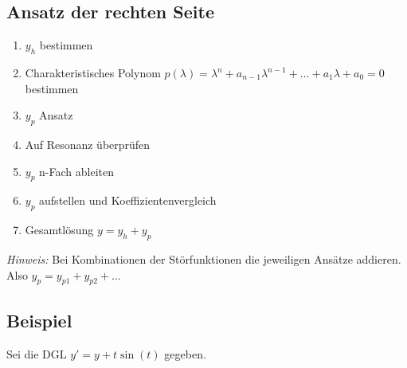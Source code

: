 \documentclass[a4paper,11pt,oneside,open=any,parskip=half, DIV=15]{scrreprt}
\begin{document}
   \subsection*{Ansatz der rechten Seite}
      \begin{enumerate}
         \item \(y_h\) bestimmen
         \item Charakteristisches Polynom \(p(\lambda) = \lambda^n + a_{n-1}\lambda^{n-1} + \ldots + a_1\lambda + a_0 = 0\) bestimmen %
         \item \(y_p\) Ansatz
         \item Auf Resonanz überprüfen
         \item \(y_p\) n-Fach ableiten
         \item \(y_p\) aufstellen und Koeffizientenvergleich
         \item Gesamtlösung \(y = y_h + y_p\)
      \end{enumerate}
      \textit{Hinweis:} Bei Kombinationen der Störfunktionen die jeweiligen Ansätze addieren. Also \(y_p = y_{p1} + y_{p2} + \ldots\)

   \subsection*{Beispiel}

      Sei die DGL \(y' = y + t\sin(t)\) gegeben.
\end{document}
